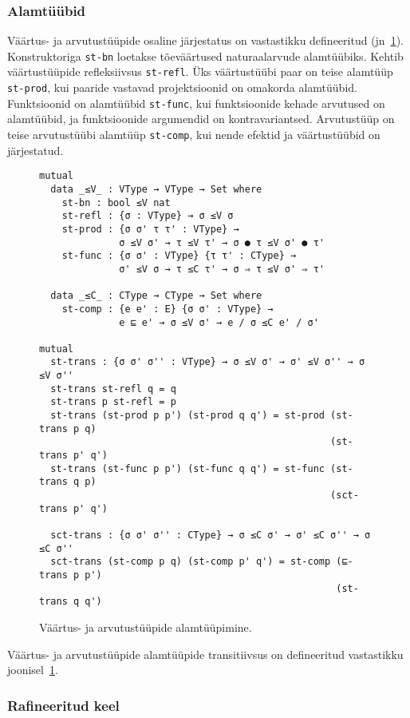 \documentclass[a4paper,12pt]{article}
\begin{document}
\subsubsection{Alamtüübid}
Väärtus- ja arvutustüüpide osaline järjestatus on vastastikku defineeritud (jn~\ref{fig:exc.subtypes}).
Konstruktoriga {\tt st-bn} loetakse tõeväärtused naturaalarvude alamtüübiks.
Kehtib väärtustüüpide refleksiivsus {\tt st-refl}.
Üks väärtustüübi paar on teise alamtüüp {\tt st-prod}, kui paaride vastavad projektsioonid on omakorda alamtüübid.
Funktsioonid on alamtüübid {\tt st-func}, kui funktsioonide kehade arvutused on alamtüübid,
ja funktsioonide argumendid on kontravariantsed.
Arvutustüüp on teise arvutustüübi alamtüüp {\tt st-comp}, kui nende efektid ja väärtustüübid on järjestatud.
\begin{figure}
  \begin{BVerbatim}
mutual
  data _≤V_ : VType → VType → Set where
    st-bn : bool ≤V nat
    st-refl : {σ : VType} → σ ≤V σ
    st-prod : {σ σ' τ τ' : VType} →
              σ ≤V σ' → τ ≤V τ' → σ ● τ ≤V σ' ● τ'
    st-func : {σ σ' : VType} {τ τ' : CType} →
              σ' ≤V σ → τ ≤C τ' → σ ⇒ τ ≤V σ' ⇒ τ'

  data _≤C_ : CType → CType → Set where
    st-comp : {e e' : E} {σ σ' : VType} →
              e ⊑ e' → σ ≤V σ' → e / σ ≤C e' / σ'

mutual
  st-trans : {σ σ' σ'' : VType} → σ ≤V σ' → σ' ≤V σ'' → σ ≤V σ''
  st-trans st-refl q = q
  st-trans p st-refl = p
  st-trans (st-prod p p') (st-prod q q') = st-prod (st-trans p q)
                                                   (st-trans p' q')
  st-trans (st-func p p') (st-func q q') = st-func (st-trans q p)
                                                   (sct-trans p' q')

  sct-trans : {σ σ' σ'' : CType} → σ ≤C σ' → σ' ≤C σ'' → σ ≤C σ''
  sct-trans (st-comp p q) (st-comp p' q') = st-comp (⊑-trans p p')
                                                    (st-trans q q')
  \end{BVerbatim}
  \caption{Väärtus- ja arvutustüüpide alamtüüpimine.}
  \label{fig:exc.subtypes}
\end{figure}

Väärtus- ja arvutustüüpide alamtüüpide transitiivsus on defineeritud vastastikku joonisel~\ref{fig:exc.subtypes}.

\subsubsection{Rafineeritud keel}
\end{document}
